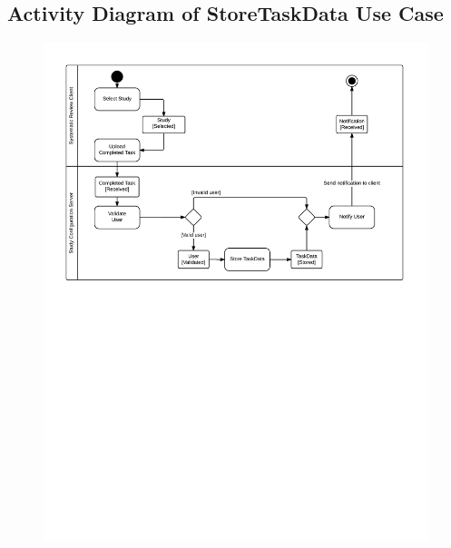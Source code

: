 \subsection{ Activity Diagram of StoreTaskData Use Case}
\begin{figure}[H]
  \includegraphics[width=45em]{section/DynamicModel/Activity_Diagram_StoreTaskData}
  \label{fig: Activity Diagram of StoreTaskData Use Casefail}
\end{figure}

